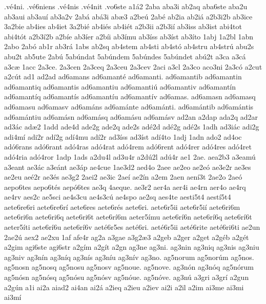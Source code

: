 {.v^^e94ni.
.v^^e96niens
.v^^e94nis
.v^^e94nit
.vo6ste
a1^^e12
2aba
aba3i
ab2aq
aba6ste
aba2u
ab3aui
ab3au^^ed
ab3a2v
2ab^^e1
ab^^e13i
ab^^e63
a2be^^fa
2ab^^e9
ab2ia
ab2i^^e1
a2b3i2b
ab3ice
3a2bie
ab4ies
ab4iet
3a2bi^^e9
ab4i^^e9s
ab4i^^e9t
a2b3ii
a2b3i^^ed
ab3iss
ab3ist
abi4tot
abi4t^^f3t
a2b3^^ed2b
a2b^^ede
ab3^^eder
a2b^^edi
ab3^^edmu
ab3^^edss
ab3^^edst
ab3^^edto
1abj
1a2bl
1abn
2abo
2ab^^f3
ab1r
ab3r^^e1
1abs
ab2sq
ab4stem
ab4sti
ab4st^^f3
ab4stru
ab4str^^fa
abu2s
abu2t
ab5ute
2ab^^fa
5ab^^fandat
5ab^^fandem
5ab^^fandes
5ab^^fandet
ab^^fa2t
a3ca
a3c^^e1
a3c^^e6
1acc
2a3ce.
2a3cen
2a3ceq
2a3ceu
2a3cev
2aci
a3cl
2a3co
aco3ni
2a3c^^f3
a2cut
a2c^^fat
ad1
ad2ad
ad6amans
ad6amant^^e9
ad6amanti.
ad6amantib
ad6amantin
ad6amantiq
ad6amantis
ad6amantiu
ad6amanti^^fa
ad6amantiv
ad6amant^^edn
ad6amant^^edq
ad6amant^^eds
ad6amant^^edu
ad6amant^^edv
ad6amas.
ad6amasn
ad6amasq
ad6amasu
ad6amasv
ad6am^^e1ns
ad6am^^e1nte
ad6am^^e1nti.
ad6am^^e1ntib
ad6am^^e1ntis
ad6am^^e1ntiu
ad6am^^e1sn
ad6am^^e1sq
ad6am^^e1su
ad6am^^e1sv
ad2an
a2dap
ada2q
ad2ar
ad3^^e1c
ad^^e62
1add
ade4d
ade2g
ade2q
ade2s
ad^^e92d
ad^^e92g
ad^^e92s
1adh
ad3i^^e1c
adi2g
adi4m^^ed
adi2r
ad^^ed2g
ad^^ed4mu
ad^^ed2r
ad3^^edss
ad3^^edst
ad^^ed4to
1adj
1adn
ado2
ad4oc
ad^^f36rans
ad^^f36rant
ad^^f34ras
ad^^f34rat
ad^^f34rem
ad^^f36rent
ad^^f34rer
ad^^f34res
ad^^f34ret
ad^^f34ria
ad^^f34ror
1adp
1ads
a2du4l
ad3u4r
a2d^^fa2l
ad^^fa4r
ae1
2ae.
aea2b3
a3eam^^fa
a3eant
ae3^^e1c
a3e^^e1nt
ae3^^e1p
ae4cue
1ae3d2
aed4o
2aee
ae2eo
ae2e^^f3
ae3e2r
ae3es
ae2eu
ae^^e92r
ae3^^e9s
ae3g2
2aei2
ae3ic
2ae^^ed
ae2^^edn
a2em
2aen
aen^^ed3t
2ae2o
2ae^^f3
aepo6tes
aepo6t^^e9s
aep^^f36tes
ae3q
4aeque.
ae3r2
aer4a
aer4i
ae4rn
aer4o
ae4rq
ae4rv
aes2c
ae5sci
ae4s3cu
ae4s3c^^fa
ae4spo
ae2sq
aes4te
aesti5t4
aest^^ed5t4
aete6re6ri
aete6re6r^^ed
aete6res
aete6r^^e9s
aete6ri.
aete6r5ii
aete6r5i^^ed
aete6ri6m
aete6ri6n
aete6ri6q
aete6ri6t
aete6r^^ed6m
aeter5^^edmu
aete6r^^ed6n
aete6r^^ed6q
aete6r^^ed6t
aeter5^^edti
aete6r^^ed6u
aete6r^^ed6v
aet^^e96r5es
aet^^e96ri.
aet^^e96r5ii
aet^^e96rite
aet^^e96ri6ti
ae2un
2ae2^^fa
aex2
ae2xu
1af
afe4r
ag2a
a3gae
a3g2^^e63
a2geb
a2ger
a2get
a2g^^e9b
a2g^^e9t
a2gim
agi6ste
agi6str
a2g^^edm
a2g^^edt
a2gn
ag3ne
ag3ni.
ag3nin
ag3niq
ag3nis
ag3niu
ag3niv
ag3n^^edn
ag3n^^edq
ag3n^^eds
ag3n^^edu
ag3n^^edv
ag3no.
ag5norum
ag5nor^^fam
ag5nos.
ag5nosn
ag5nosq
ag5nosu
ag5nosv
ag5noue.
ag5nove.
ag3n^^f3n
ag3n^^f3q
ag5n^^f3rum
ag5n^^f3sn
ag5n^^f3sq
ag5n^^f3su
ag5n^^f3sv
ag5n^^f3ue.
ag5n^^f3ve.
ag3n^^fa
a3gri
a3gr^^ed
a2gun
a2g^^fan
a1i
ai2a
aiad2
ai4an
ai2^^e1
a2ieq
a2ieu
a2iev
ai2i
a2il
a2im
ai3me
ai3mi
ai3m^^ed
}
